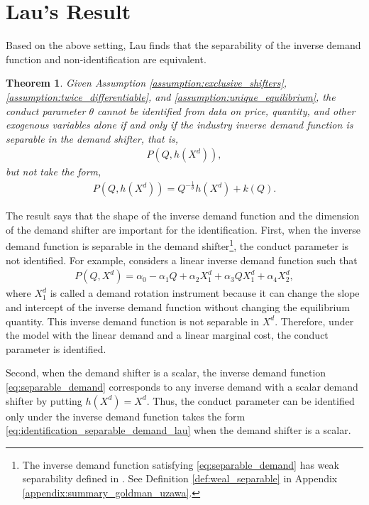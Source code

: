 \documentclass[11pt, a4paper]{article}
\newtheorem{theorem}{Theorem}
\theoremstyle{remark}
\begin{document}
\section{Lau's Result}\label{sec:lau_result} \label{sec:lau_result}
Based on the above setting, Lau finds that the separability of the inverse demand function and non-identification are equivalent.
\begin{theorem}\label{theorem_lau}
    Given Assumption \ref{assumption:exclusive_shifters}, \ref{assumption:twice_differentiable}, and \ref{assumption:unique_equilibrium},
    the conduct parameter $\theta$ cannot be identified from data on price, quantity, and other exogenous variables alone if and only if the industry inverse demand function is separable in the demand shifter, that is,
    \begin{align}
        P(Q, h(X^{d})), \label{eq:separable_demand}
    \end{align}
    but not take the form, 
    \begin{align}
        P(Q, h(X^{d})) = Q^{-\frac{1}{\theta}}h(X^{d}) + k(Q). \label{eq:identification_separable_demand_lau}
    \end{align}
\end{theorem}
The result says that the shape of the inverse demand function and the dimension of the demand shifter are important for the identification.
First, when the inverse demand function is separable in the demand shifter\footnote{The inverse demand function satisfying \eqref{eq:separable_demand} has weak separability defined in \citet{goldmanNote1964}. See Definition \ref{def:weal_separable} in Appendix \ref{appendix:summary_goldman_uzawa}.}, the conduct parameter is not identified.
For example, \citet{bresnahan1982oligopoly} considers a linear inverse demand function such that
\begin{align}
    P(Q, X^{d}) = \alpha_0 - \alpha_1Q + \alpha_2X^{d}_1 + \alpha_3QX^{d}_1 + \alpha_4X^{d}_2, \label{eq:demand_bresnahan}
\end{align}
where $X^{d}_1$ is called a demand rotation instrument because it can change the slope and intercept of the inverse demand function without changing the equilibrium quantity.
This inverse demand function is not separable in $X^{d}$.
Therefore, under the model with the linear demand and a linear marginal cost, the conduct parameter is identified.

Second, when the demand shifter is a scalar, the inverse demand function \eqref{eq:separable_demand} corresponds to any inverse demand with a scalar demand shifter by putting $h(X^{d})= X^{d}$.
Thus, the conduct parameter can be identified only under the inverse demand function takes the form \eqref{eq:identification_separable_demand_lau} when the demand shifter is a scalar.
\end{document}
